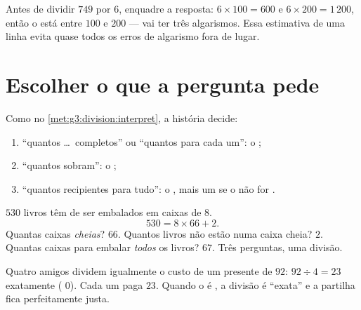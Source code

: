 \begin{example}\label{ex:g4:division:size}
Antes de dividir $749$ por $6$, enquadre a resposta:
$6 \times 100 = 600$ e $6 \times 200 = 1\,200$, então o 
está entre $100$ e $200$ --- vai ter três algarismos. Essa
estimativa de uma linha evita quase todos os erros de algarismo fora
de lugar.
\end{example}

\section{Escolher o que a pergunta pede}

\begin{method}\label{met:g4:division:interpret}
Como no \cref{met:g3:division:interpret}, a história decide:
\begin{enumerate}
  \item ``quantos \dots\ completos'' ou ``quantos para cada um'': o
        ;
  \item ``quantos sobram'': o ;
  \item ``quantos recipientes para tudo'': o , mais um se o
         não for .
\end{enumerate}
\end{method}

\begin{example}\label{ex:g4:division:problem}
$530$ livros têm de ser embalados em caixas de $8$.
\[
530 = 8 \times 66 + 2 .
\]
Quantas caixas \emph{cheias}? $66$. Quantos livros não estão numa
caixa cheia? $2$. Quantas caixas para embalar \emph{todos} os
livros? $67$. Três perguntas, uma divisão.
\end{example}

\begin{example}\label{ex:g4:division:money}
Quatro amigos dividem igualmente o custo de um presente de $92$:
$92 \div 4 = 23$ exatamente ( $0$). Cada um paga $23$. Quando o
 é , a divisão é ``exata'' e a partilha fica perfeitamente
justa.
\end{example}

